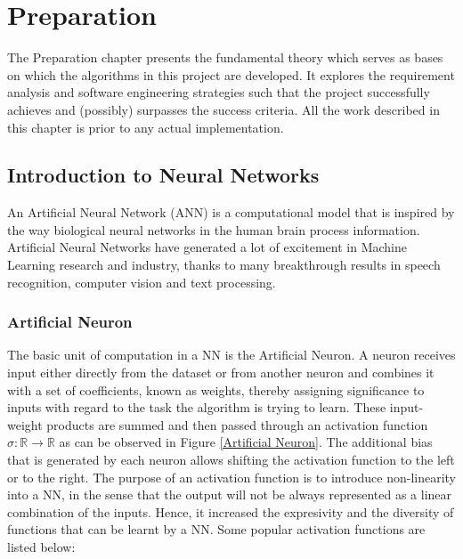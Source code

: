 

\chapter{Preparation}

The Preparation chapter presents the fundamental theory which serves as bases on which the algorithms in this project are developed. It explores the requirement analysis and software engineering strategies such that the project successfully achieves and (possibly) surpasses the success criteria. All the work described in this chapter is prior to any actual implementation.


\section{Introduction to Neural Networks}

An Artificial Neural Network (ANN) is a computational model that is inspired by the way biological neural networks in the human brain process information. Artificial Neural Networks have generated a lot of excitement in Machine Learning research and industry, thanks to many breakthrough results in speech recognition, computer vision and text processing.

\subsection{Artificial Neuron}

The basic unit of computation in a NN is the Artificial Neuron. A neuron receives input either directly from the dataset or from another neuron and combines it with a set of coefficients, known as weights, thereby assigning significance to inputs with regard to the task the algorithm is trying to learn. These input-weight products are summed and then passed through an activation function $\sigma : \mathbb{R} \rightarrow \mathbb{R}$ as can be observed in Figure \ref{Artificial Neuron}. The additional bias that is generated by each neuron allows shifting the activation function to the left or to the right. The purpose of an activation function is to introduce non-linearity into a NN, in the sense that the output will not be always represented as a linear combination of the inputs. Hence, it increased the expresivity and the diversity of functions that can be learnt by a NN. Some popular activation functions are listed below:

